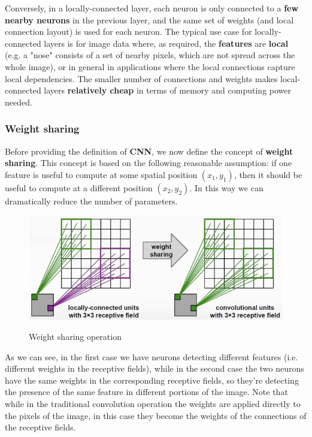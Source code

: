 Conversely, in a locally-connected layer, each neuron is only connected to a \textbf{few nearby neurons} in the previous layer, and the same set of weights (and local connection layout) is used for each neuron. The typical use case for locally-connected layers is for image data where, as required, the \textbf{features} are \textbf{local} (e.g. a "nose" consists of a set of nearby pixels, which are not spread across the whole image), or in general in applications where the local connections capture local dependencies. The smaller number of connections and weights makes local-connected layers \textbf{relatively cheap} in terms of memory and computing power needed.

\subsubsection{Weight sharing}

Before providing the definition of \textbf{CNN}, we now define the concept of \textbf{weight sharing}. This concept is based on the following reasonable assumption: if one feature is useful to compute at some spatial position $(x_1, y_1)$, then it should be useful to compute at a different position $(x_2, y_2)$. In this way we can dramatically reduce the number of parameters.

\begin{figure}[h!]
		\centering
        \includegraphics[scale = 1.5]{img/weight sharing.jpg}
		\label{mi}
        \caption{Weight sharing operation}
\end{figure}

As we can see, in the first case we have neurons detecting different features (i.e. different weights in the receptive fields), while in the second case the two neurons have the same weights in the corresponding receptive fields, so they're detecting the presence of the same feature in different portions of the image. Note that while in the traditional convolution operation the weights are applied directly to the pixels of the image, in this case they become the weights of the connections of the receptive fields. 

